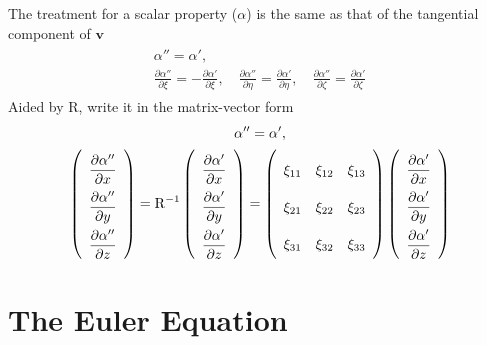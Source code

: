 \documentclass[a4paper,12pt,dvips]{article}
\begin{document}
The treatment for a scalar property ($\alpha$) is the same as that of the
tangential component of $\mathbf{v}$
\begin{align*}
\begin{gathered}
  \alpha'' = \alpha', \\
  \frac{\partial \alpha''}{\partial\xi} =
  -\frac{\partial \alpha'}{\partial\xi}, \quad
  \frac{\partial \alpha''}{\partial\eta} =
  \frac{\partial \alpha'}{\partial\eta}, \quad
  \frac{\partial \alpha''}{\partial\zeta} =
  \frac{\partial \alpha'}{\partial\zeta}
\end{gathered}
\end{align*}
Aided by $\mathrm{R}$, write it in the matrix-vector form
\begin{align}
\begin{gathered}
  \alpha'' = \alpha', \\
  \renewcommand{\arraystretch}{2.2}
  \left(\begin{array}{c}
    \dfrac{\partial\alpha''}{\partial x} \\
    \dfrac{\partial\alpha''}{\partial y} \\
    \dfrac{\partial\alpha''}{\partial z} \\
  \end{array}\right)
  = \mathrm{R}^{-1}
  \left(\begin{array}{c}
    \dfrac{\partial\alpha'}{\partial x} \\
    \dfrac{\partial\alpha'}{\partial y} \\
    \dfrac{\partial\alpha'}{\partial z} \\
  \end{array}\right)
  = \left(\begin{array}{ccc}
    \xi_{11} & \xi_{12} & \xi_{13} \\
    \xi_{21} & \xi_{22} & \xi_{23} \\
    \xi_{31} & \xi_{32} & \xi_{33}
  \end{array}\right)
  \left(\begin{array}{c}
    \dfrac{\partial\alpha'}{\partial x} \\
    \dfrac{\partial\alpha'}{\partial y} \\
    \dfrac{\partial\alpha'}{\partial z} \\
  \end{array}\right)
\end{gathered}
\label{e:treat:sca}
\end{align}

\section{The Euler Equation}
\end{document}
